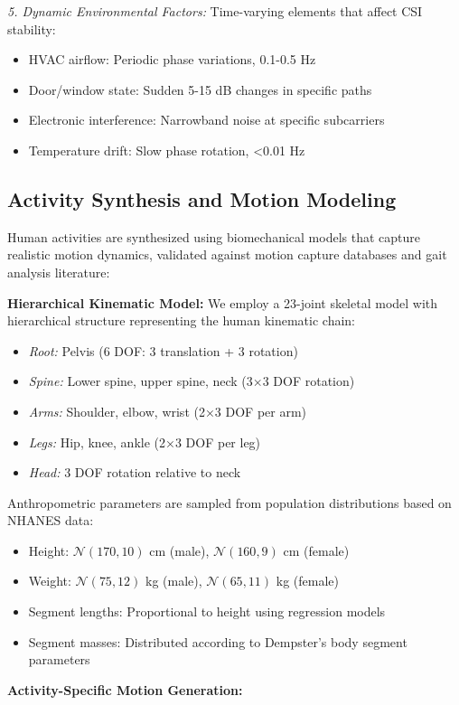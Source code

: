 \documentclass[journal]{IEEEtran}
\begin{document}
\textit{5. Dynamic Environmental Factors:}
Time-varying elements that affect CSI stability:
\begin{itemize}
\item HVAC airflow: Periodic phase variations, 0.1-0.5 Hz
\item Door/window state: Sudden 5-15 dB changes in specific paths
\item Electronic interference: Narrowband noise at specific subcarriers
\item Temperature drift: Slow phase rotation, <0.01 Hz
\end{itemize}

\subsection{Activity Synthesis and Motion Modeling}
Human activities are synthesized using biomechanical models that capture realistic motion dynamics, validated against motion capture databases and gait analysis literature:

\textbf{Hierarchical Kinematic Model:} We employ a 23-joint skeletal model with hierarchical structure representing the human kinematic chain:
\begin{itemize}
\item \textit{Root:} Pelvis (6 DOF: 3 translation + 3 rotation)
\item \textit{Spine:} Lower spine, upper spine, neck (3×3 DOF rotation)
\item \textit{Arms:} Shoulder, elbow, wrist (2×3 DOF per arm)
\item \textit{Legs:} Hip, knee, ankle (2×3 DOF per leg)
\item \textit{Head:} 3 DOF rotation relative to neck
\end{itemize}

Anthropometric parameters are sampled from population distributions based on NHANES data:
\begin{itemize}
\item Height: $\mathcal{N}(170, 10)$ cm (male), $\mathcal{N}(160, 9)$ cm (female)
\item Weight: $\mathcal{N}(75, 12)$ kg (male), $\mathcal{N}(65, 11)$ kg (female)
\item Segment lengths: Proportional to height using regression models
\item Segment masses: Distributed according to Dempster's body segment parameters
\end{itemize}

\textbf{Activity-Specific Motion Generation:}
\end{document}
